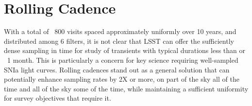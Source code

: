 

%

%
%
%
%
%
%

\section{ Rolling Cadence }
\label{sec:rolling}



With a total of ~800 visits spaced approximately uniformly over 10 years, and distributed among 6 filters,
it is not clear that LSST can offer the sufficiently dense sampling in time for study of transients with typical durations less than or ~1 month.
This is particularly a concern for key science requiring well-sampled SNIa light curves.  Rolling cadences stand out as a
general solution that can potentially enhance sampling rates by 2X or more, on part of the sky all of the time and all of the sky some of the time,
while maintaining a sufficient uniformity for survey objectives that require it.


